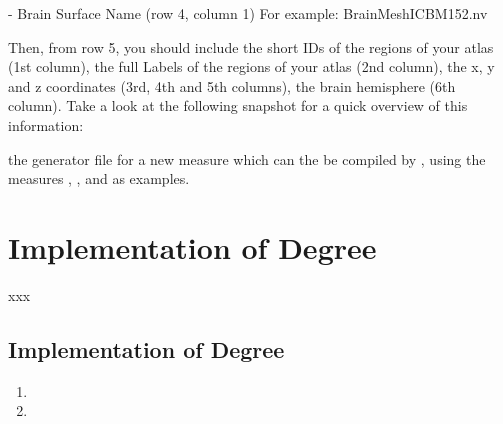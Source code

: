 \documentclass{tufte-handout}
\begin{document}
- Brain Surface Name (row 4, column 1)
For example: BrainMeshICBM152.nv


Then, from row 5, you should include the short IDs of the regions of your atlas (1st column), the full Labels of the  regions of your atlas (2nd column), the x, y and z coordinates (3rd, 4th and 5th columns), the brain hemisphere (6th column). Take a look at the following snapshot for a quick overview of this information:







the generator file  for a new measure which can the be compiled by , using the measures , , and  as examples.

\tableofcontents

\clearpage
\section{Implementation of Degree}

xxx

\subsection{Implementation of Degree}

\begin{enumerate}
\item
\item
\end{enumerate}

%
%
\end{document}
